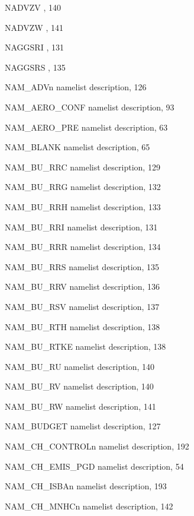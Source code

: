\begin{theindex}
  \item NADVZV
    \subitem {},  140
  \item NADVZW
    \subitem {},  141
  \item NAGGSRI
    \subitem {},  131
  \item NAGGSRS
    \subitem {},  135
  \item NAM\_ADVn
    \subitem namelist description,  126
  \item NAM\_AERO\_CONF
    \subitem namelist description,  93
  \item NAM\_AERO\_PRE
    \subitem namelist description,  63
  \item NAM\_BLANK 
    \subitem namelist description,  65
  \item NAM\_BU\_RRC
    \subitem namelist description,  129
  \item NAM\_BU\_RRG
    \subitem namelist description,  132
  \item NAM\_BU\_RRH
    \subitem namelist description,  133
  \item NAM\_BU\_RRI
    \subitem namelist description,  131
  \item NAM\_BU\_RRR
    \subitem namelist description,  134
  \item NAM\_BU\_RRS
    \subitem namelist description,  135
  \item NAM\_BU\_RRV
    \subitem namelist description,  136
  \item NAM\_BU\_RSV
    \subitem namelist description,  137
  \item NAM\_BU\_RTH
    \subitem namelist description,  138
  \item NAM\_BU\_RTKE
    \subitem namelist description,  138
  \item NAM\_BU\_RU
    \subitem namelist description,  140
  \item NAM\_BU\_RV
    \subitem namelist description,  140
  \item NAM\_BU\_RW
    \subitem namelist description,  141
  \item NAM\_BUDGET
    \subitem namelist description,  127
  \item NAM\_CH\_CONTROLn
    \subitem namelist description,  192
  \item NAM\_CH\_EMIS\_PGD
    \subitem namelist description,  54
  \item NAM\_CH\_ISBAn
    \subitem namelist description,  193
  \item NAM\_CH\_MNHCn
    \subitem namelist description,  142

\end{theindex}
